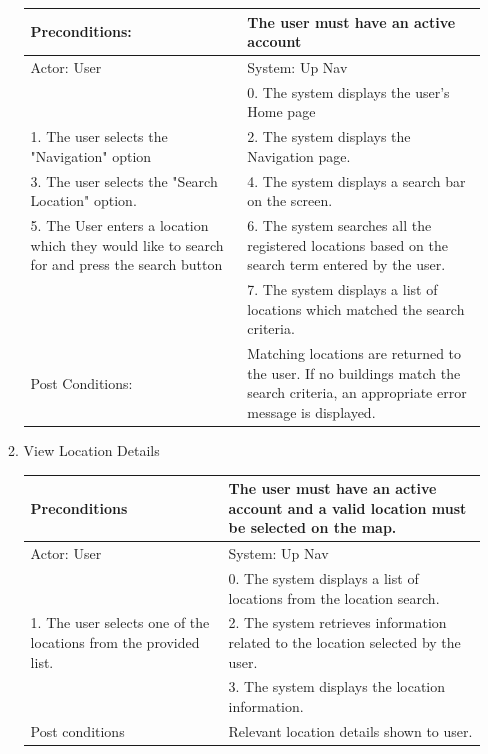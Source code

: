 \documentclass{article}
\begin{document}
\begin{center}
\begin{enumerate}
\begin{enumerate}
	\begin{table}[]
	\centering
		\begin{tabular}{ | m{15em} | m{15em}| } 
		\hline
		Preconditions: 													& The user must have an active account \\
		\hline
		Actor: User 														&  System: Up Nav \\ 
		\hline
																	& 0. The system  displays the user's Home page\\ 
		\hline
		1. The user selects the "Navigation" option									& 2. The system displays the Navigation page. \\
		\hline
		3. The user selects the "Search Location" option.								& 4. The system displays a search bar on the screen. \\ 
		\hline
		5. The User enters a location which they would like to search for and press the search button		& 6. The system searches all the registered locations based on the search term entered by the user. \\
		\hline
																	& 7. The system displays a list of locations which matched the search criteria. \\
		\hline
		Post Conditions:													&Matching locations are returned to the user. If no buildings match the search criteria, an appropriate error message is displayed. \\
		\hline
		\end{tabular}
	\end{table}

	\item{View Location Details}
	\begin{table}[]
	\centering
		\begin{tabular}{ | m{15em} | m{15em}| } 
		\hline
		Preconditions                                                     					& The user must have an active account and a valid location must be selected on the map. \\ 
		\hline
		Actor: User                                                      					& System: Up Nav  \\ 
		\hline
                                                                 							& 0. The system displays a list of locations from the location search.  \\
		 \hline
		1. The user selects one of the locations from the provided list. 		& 2. The system retrieves information related to the location selected by the user. \\ 
		\hline
                                                                 							& 3. The system displays the location information. \\ 
		\hline
		Post conditions									& Relevant location details shown to user. \\
		\hline
		\end{tabular}
	\end{table}


\end{enumerate}
\end{enumerate}
\end{center}
\end{document}
